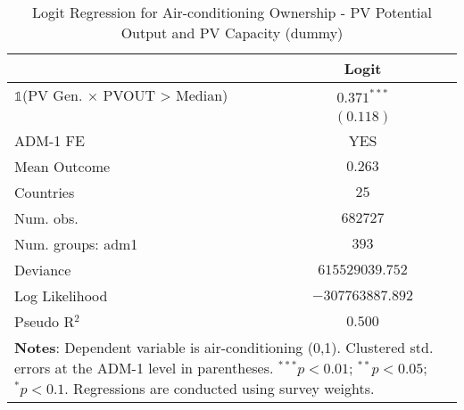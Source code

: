 
\begin{table}[H]
\caption{Logit Regression for Air-conditioning Ownership - PV Potential Output and PV Capacity (dummy)}
\begin{center}
\begin{tabular}{l c}
\hline
 & Logit \\
\hline
$\mathds{1}$(PV Gen. $\times$ PVOUT > Median) & $0.371^{***}$    \\
                                              & $(0.118)$        \\
\hline
ADM-1 FE                                      & YES              \\
Mean Outcome                                  & $0.263$          \\
Countries                                     & $25$             \\
Num. obs.                                     & $682727$         \\
Num. groups: adm1                             & $393$            \\
Deviance                                      & $615529039.752$  \\
Log Likelihood                                & $-307763887.892$ \\
Pseudo R$^2$                                  & $0.500$          \\
\hline
\multicolumn{2}{l}{\scriptsize{\textbf{Notes}: Dependent variable is air-conditioning (0,1). Clustered std. errors at the ADM-1 level in parentheses. $^{***}p<0.01$; $^{**}p<0.05$; $^{*}p<0.1$. Regressions are conducted using survey weights.}}
\end{tabular}
\label{main: tableA9_2}
\end{center}
\end{table}
